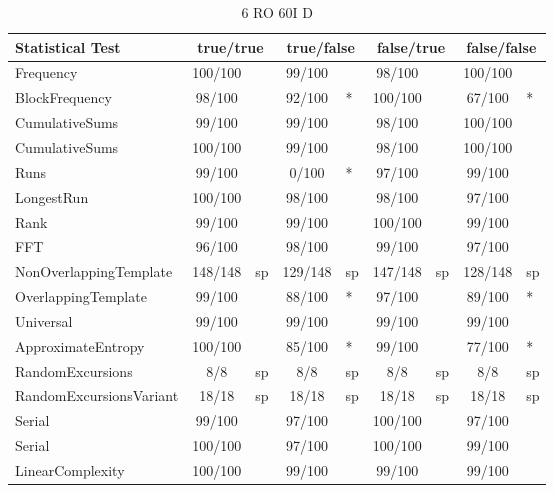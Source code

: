 \begin{table}[H]
\centering
\caption{6 RO 60I D}
\label{tab:nist_22_3RO_21I_L}
\begin{tabular}{|l|c|l|c|l|c|l|c|l|}
\hline
\textbf{Statistical Test} & \multicolumn{2}{c|}{\textbf{true/true}} & \multicolumn{2}{c|}{\textbf{true/false}} & \multicolumn{2}{c|}{\textbf{false/true}} & \multicolumn{2}{c|}{\textbf{false/false}} \\ \hline
Frequency               & 100/100 &     &  99/100 &     &  98/100 &     & 100/100 &     \\ \hline
BlockFrequency          &  98/100 &     &  92/100 & *   & 100/100 &     &  67/100 & *   \\ \hline
CumulativeSums          &  99/100 &     &  99/100 &     &  98/100 &     & 100/100 &     \\ \hline
CumulativeSums          & 100/100 &     &  99/100 &     &  98/100 &     & 100/100 &     \\ \hline
Runs                    &  99/100 &     &   0/100 & *   &  97/100 &     &  99/100 &     \\ \hline
LongestRun              & 100/100 &     &  98/100 &     &  98/100 &     &  97/100 &     \\ \hline
Rank                    &  99/100 &     &  99/100 &     & 100/100 &     &  99/100 &     \\ \hline
FFT                     &  96/100 &     &  98/100 &     &  99/100 &     &  97/100 &     \\ \hline
NonOverlappingTemplate  & 148/148 & sp  & 129/148 & sp  & 147/148 & sp  & 128/148 & sp  \\ \hline
OverlappingTemplate     &  99/100 &     &  88/100 & *   &  97/100 &     &  89/100 & *   \\ \hline
Universal               &  99/100 &     &  99/100 &     &  99/100 &     &  99/100 &     \\ \hline
ApproximateEntropy      & 100/100 &     &  85/100 & *   &  99/100 &     &  77/100 & *   \\ \hline
RandomExcursions        &     8/8 & sp  &     8/8 & sp  &     8/8 & sp  &     8/8 & sp  \\ \hline
RandomExcursionsVariant &   18/18 & sp  &   18/18 & sp  &   18/18 & sp  &   18/18 & sp  \\ \hline
Serial                  &  99/100 &     &  97/100 &     & 100/100 &     &  97/100 &     \\ \hline
Serial                  & 100/100 &     &  97/100 &     & 100/100 &     &  99/100 &     \\ \hline
LinearComplexity        & 100/100 &     &  99/100 &     &  99/100 &     &  99/100 &     \\ \hline
\end{tabular}
\end{table}